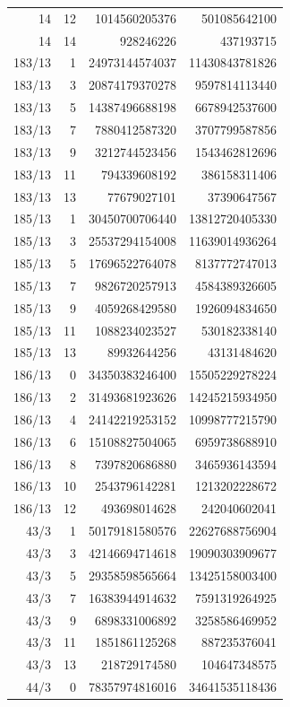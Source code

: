 \begin{longtable}{@{}rrrr@{}}
14 & 12 & 1014560205376 & 501085642100\\
14 & 14 & 928246226 & 437193715\\
183/13 & 1 & 24973144574037 & 11430843781826\\
183/13 & 3 & 20874179370278 & 9597814113440\\
183/13 & 5 & 14387496688198 & 6678942537600\\
183/13 & 7 & 7880412587320 & 3707799587856\\
183/13 & 9 & 3212744523456 & 1543462812696\\
183/13 & 11 & 794339608192 & 386158311406\\
183/13 & 13 & 77679027101 & 37390647567\\
185/13 & 1 & 30450700706440 & 13812720405330\\
185/13 & 3 & 25537294154008 & 11639014936264\\
185/13 & 5 & 17696522764078 & 8137772747013\\
185/13 & 7 & 9826720257913 & 4584389326605\\
185/13 & 9 & 4059268429580 & 1926094834650\\
185/13 & 11 & 1088234023527 & 530182338140\\
185/13 & 13 & 89932644256 & 43131484620\\
186/13 & 0 & 34350383246400 & 15505229278224\\
186/13 & 2 & 31493681923626 & 14245215934950\\
186/13 & 4 & 24142219253152 & 10998777215790\\
186/13 & 6 & 15108827504065 & 6959738688910\\
186/13 & 8 & 7397820686880 & 3465936143594\\
186/13 & 10 & 2543796142281 & 1213202228672\\
186/13 & 12 & 493698014628 & 242040602041\\
43/3 & 1 & 50179181580576 & 22627688756904\\
43/3 & 3 & 42146694714618 & 19090303909677\\
43/3 & 5 & 29358598565664 & 13425158003400\\
43/3 & 7 & 16383944914632 & 7591319264925\\
43/3 & 9 & 6898331006892 & 3258586469952\\
43/3 & 11 & 1851861125268 & 887235376041\\
43/3 & 13 & 218729174580 & 104647348575\\
44/3 & 0 & 78357974816016 & 34641535118436\\

\end{longtable}
